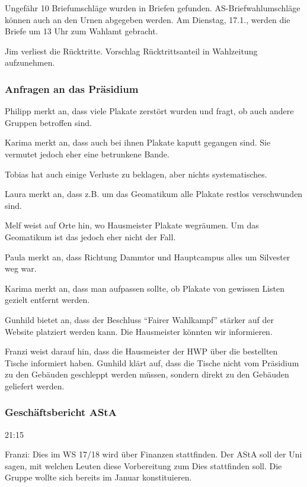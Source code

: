 \documentclass[ngerman,headheight=70pt]{scrartcl}
\begin{document}
    Ungefähr 10 Briefumschläge wurden in Briefen gefunden. AS-Briefwahlumschläge
    können auch an den Urnen abgegeben werden. Am Dienstag, 17.1., werden die
    Briefe um 13 Uhr zum Wahlamt gebracht.

    Jim verliest die Rücktritte. Vorschlag Rücktrittsanteil in Wahlzeitung
    aufzunehmen.

    \subsubsection{Anfragen an das Präsidium}

    Philipp merkt an, dass viele Plakate zerstört wurden und fragt, ob auch andere
    Gruppen betroffen sind.

    Karima merkt an, dass auch bei ihnen Plakate kaputt gegangen sind. Sie vermutet
    jedoch eher eine betrunkene Bande.

    Tobias hat auch einige Verluste zu beklagen, aber nichts systematisches.

    Laura merkt an, dass z.B. um das Geomatikum alle Plakate restlos verschwunden
    sind.

    Melf weist auf Orte hin, wo Hausmeister Plakate wegräumen. Um das Geomatikum
    ist das jedoch eher nicht der Fall.

    Paula merkt an, dass Richtung Dammtor und Hauptcampus alles um Silvester
    weg war.

    Karima merkt an, dass man aufpassen sollte, ob Plakate von gewissen Listen
    gezielt entfernt werden.

    Gunhild bietet an, dass der Beschluss ``Fairer Wahlkampf'' stärker auf der
    Website platziert werden kann. Die Hausmeister könnten wir informieren.

    Franzi weist darauf hin, dass die Hausmeister der HWP über die bestellten
    Tische informiert haben. Gunhild klärt auf, dass die Tische nicht vom
    Präsidium zu den Gebäuden geschleppt werden müssen, sondern direkt zu den
    Gebäuden geliefert werden.

    \subsubsection{Geschäftsbericht AStA}

    21:15

    Franzi:
    Dies im WS 17/18 wird über Finanzen stattfinden. Der AStA soll der Uni sagen,
    mit welchen Leuten diese Vorbereitung zum Dies stattfinden soll. Die Gruppe
    wollte sich bereits im Januar konstituieren.
\end{document}
